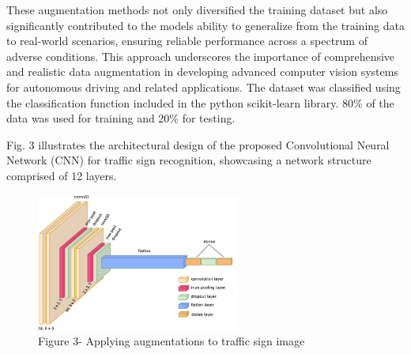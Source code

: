 \begin{multicols}{2}
These augmentation methods not only diversified the training dataset but
also significantly contributed to the model\textquotesingle s ability to
generalize from the training data to real-world scenarios, ensuring
reliable performance across a spectrum of adverse conditions. This
approach underscores the importance of comprehensive and realistic data
augmentation in developing advanced computer vision systems for
autonomous driving and related applications. The dataset was classified
using the classification function included in the python scikit-learn
library. 80\% of the data was used for training and 20\% for testing.

Fig. 3 illustrates the architectural design of the proposed
Convolutional Neural Network (CNN) for traffic sign recognition,
showcasing a network structure comprised of 12 layers.
\end{multicols}

\begin{figure}[H]
	\centering
	\includegraphics[width=0.6\textwidth]{assets/59}
	\caption*{Figure 3- Applying augmentations to traffic sign image}
\end{figure}

